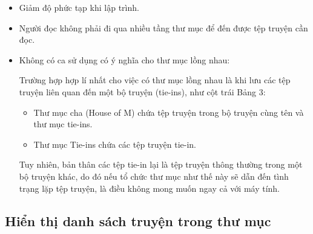 \documentclass[../../thesis]{subfiles}
\begin{document}
\begin{itemize}
    \item
        Giảm độ phức tạp khi lập trình.
    \item
        Người đọc không phải đi qua nhiều tầng thư mục để đến được tệp truyện
        cần đọc.
    \item
        Không có ca sử dụng có ý nghĩa cho thư mục lồng nhau:

        Trường hợp hợp lí nhất cho việc có thư mục lồng nhau là khi lưu các tệp
        truyện liên quan đến một bộ truyện (tie-ins), như cột trái Bảng 3:

        \begin{itemize}
            \item
                Thư mục cha (House of M) chứa tệp truyện trong bộ truyện cùng
                tên và thư mục tie-ins.
            \item
                Thư mục Tie-ins chứa các tệp truyện tie-in.
        \end{itemize}

        Tuy nhiên, bản thân các tệp tie-in lại là tệp truyện thông thường trong
        một bộ truyện khác, do đó nếu tổ chức thư mục như thế này sẽ dẫn đến
        tình trạng lặp tệp truyện, là điều không mong muốn ngay cả với máy tính.
\end{itemize}


\subsection{Hiển thị danh sách truyện trong thư mục}\label{sec:show-comics-in-folder}
\end{document}
